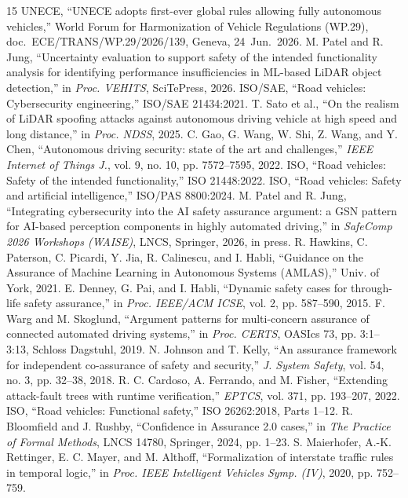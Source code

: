 \documentclass[conference,a4paper]{IEEEtran}
\begin{document}
	\begin{thebibliography}{15}
		\scriptsize\setlength{\itemsep}{0pt}\setlength{\parskip}{0pt}
		 UNECE, ``UNECE adopts first-ever global rules allowing fully autonomous vehicles,'' World Forum for Harmonization of Vehicle Regulations (WP.29), doc.\ ECE/TRANS/WP.29/2026/139, Geneva, 24~Jun.\ 2026.
		 M. Patel and R. Jung, ``Uncertainty evaluation to support safety of the intended functionality analysis for identifying performance insufficiencies in ML-based LiDAR object detection,'' in \emph{Proc. VEHITS}, SciTePress, 2026.
		 ISO/SAE, ``Road vehicles: Cybersecurity engineering,'' ISO/SAE 21434:2021.
		 T. Sato et al., ``On the realism of LiDAR spoofing attacks against autonomous driving vehicle at high speed and long distance,'' in \emph{Proc. NDSS}, 2025.
		 C. Gao, G. Wang, W. Shi, Z. Wang, and Y. Chen, ``Autonomous driving security: state of the art and challenges,'' \emph{IEEE Internet of Things J.}, vol. 9, no. 10, pp. 7572--7595, 2022.
		 ISO, ``Road vehicles: Safety of the intended functionality,'' ISO 21448:2022.
		 ISO, ``Road vehicles: Safety and artificial intelligence,'' ISO/PAS 8800:2024.
		 M. Patel and R. Jung, ``Integrating cybersecurity into the AI safety assurance argument: a GSN pattern for AI-based perception components in highly automated driving,'' in \emph{SafeComp 2026 Workshops (WAISE)}, LNCS, Springer, 2026, in press.
		 R. Hawkins, C. Paterson, C. Picardi, Y. Jia, R. Calinescu, and I. Habli, ``Guidance on the Assurance of Machine Learning in Autonomous Systems (AMLAS),'' Univ. of York, 2021.
		 E. Denney, G. Pai, and I. Habli, ``Dynamic safety cases for through-life safety assurance,'' in \emph{Proc. IEEE/ACM ICSE}, vol. 2, pp. 587--590, 2015.
		 F. Warg and M. Skoglund, ``Argument patterns for multi-concern assurance of connected automated driving systems,'' in \emph{Proc. CERTS}, OASIcs 73, pp. 3:1--3:13, Schloss Dagstuhl, 2019.
		 N. Johnson and T. Kelly, ``An assurance framework for independent co-assurance of safety and security,'' \emph{J. System Safety}, vol. 54, no. 3, pp. 32--38, 2018.
		 R. C. Cardoso, A. Ferrando, and M. Fisher, ``Extending attack-fault trees with runtime verification,'' \emph{EPTCS}, vol. 371, pp. 193--207, 2022.
		 ISO, ``Road vehicles: Functional safety,'' ISO 26262:2018, Parts 1--12.
		 R. Bloomfield and J. Rushby, ``Confidence in Assurance 2.0 cases,'' in \emph{The Practice of Formal Methods}, LNCS 14780, Springer, 2024, pp. 1--23.
		 S. Maierhofer, A.-K. Rettinger, E. C. Mayer, and M. Althoff, ``Formalization of interstate traffic rules in temporal logic,'' in \emph{Proc. IEEE Intelligent Vehicles Symp. (IV)}, 2020, pp. 752--759.
	\end{thebibliography}
\end{document}
